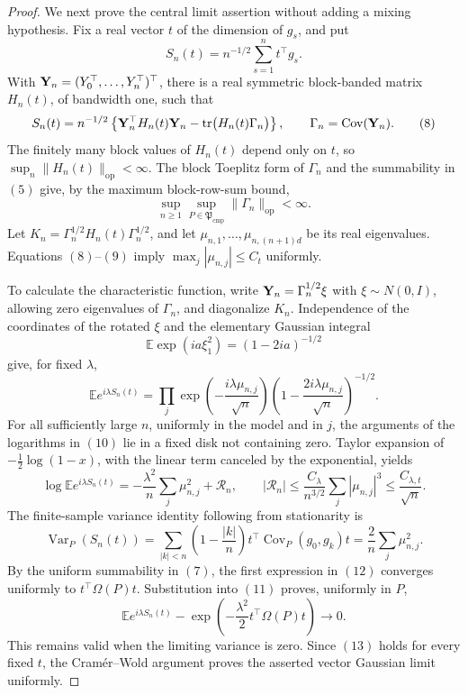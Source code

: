 \documentclass{article}
\begin{document}
\begin{proof}
We next prove the central limit assertion without adding a mixing hypothesis.  Fix a real vector \(t\) of the dimension of \(g_s\), and put
\[
 S_n(t)=n^{-1/2}\sum_{s=1}^{n}t^\top g_s.
\]
With \({\bf Y}_n=(Y_0^\top,\ldots,Y_n^\top)^\top\), there is a real symmetric block-banded matrix \(H_n(t)\), of bandwidth one, such that
\[
 S_n(t)=n^{-1/2}
 \left\{{\bf Y}_n^\top H_n(t){\bf Y}_n
 -\operatorname{tr}\bigl(H_n(t)\Gamma_n\bigr)\right\},
 \qquad \Gamma_n=\operatorname{Cov}({\bf Y}_n).            \tag{8}
\]
The finitely many block values of \(H_n(t)\) depend only on \(t\), so \(\sup_n\lVert H_n(t)\rVert_{\mathrm{op}}<\infty\).  The block Toeplitz form of \(\Gamma_n\) and the summability in \((5)\) give, by the maximum block-row-sum bound,
\[
 \sup_{n\ge1}\sup_{P\in\mathfrak P_{\mathrm{cmp}}}
 \lVert\Gamma_n\rVert_{\mathrm{op}}<\infty.               \tag{9}
\]
Let \(K_n=\Gamma_n^{1/2}H_n(t)\Gamma_n^{1/2}\), and let \(\mu_{n,1},\ldots,\mu_{n,(n+1)d}\) be its real eigenvalues.  Equations \((8)\)--\((9)\) imply \(\max_j|\mu_{n,j}|\le C_t\) uniformly.

To calculate the characteristic function, write \({\bf Y}_n=\Gamma_n^{1/2}\xi\) with \(\xi\sim N(0,I)\), allowing zero eigenvalues of \(\Gamma_n\), and diagonalize \(K_n\).  Independence of the coordinates of the rotated \(\xi\) and the elementary Gaussian integral
\[
 \mathbb E\exp(i a\xi_1^2)=(1-2ia)^{-1/2}
\]
give, for fixed \(\lambda\),
\[
 \mathbb E e^{i\lambda S_n(t)}
 =\prod_j
 \exp\!\left(-\frac{i\lambda\mu_{n,j}}{\sqrt n}\right)
 \left(1-\frac{2i\lambda\mu_{n,j}}{\sqrt n}\right)^{-1/2}. \tag{10}
\]
For all sufficiently large \(n\), uniformly in the model and in \(j\), the arguments of the logarithms in \((10)\) lie in a fixed disk not containing zero.  Taylor expansion of \(-\frac12\log(1-x)\), with the linear term canceled by the exponential, yields
\[
 \log\mathbb E e^{i\lambda S_n(t)}
 =-\frac{\lambda^2}{n}\sum_j\mu_{n,j}^2+\mathcal R_n,
 \qquad
 |\mathcal R_n|
 \le \frac{C_\lambda}{n^{3/2}}\sum_j|\mu_{n,j}|^3
 \le\frac{C_{\lambda,t}}{\sqrt n}.                        \tag{11}
\]
The finite-sample variance identity following from stationarity is
\[
 \operatorname{Var}_P(S_n(t))
 =\sum_{|k|<n}\left(1-\frac{|k|}{n}\right)
 t^\top\operatorname{Cov}_P(g_0,g_k)t
 =\frac{2}{n}\sum_j\mu_{n,j}^2.                            \tag{12}
\]
By the uniform summability in \((7)\), the first expression in \((12)\) converges uniformly to \(t^\top\Omega(P)t\).  Substitution into \((11)\) proves, uniformly in \(P\),
\[
 \mathbb E e^{i\lambda S_n(t)}
 -\exp\!\left(-\frac{\lambda^2}{2}t^\top\Omega(P)t\right)
 \longrightarrow0.                                        \tag{13}
\]
This remains valid when the limiting variance is zero.  Since \((13)\) holds for every fixed \(t\), the Cram\'er--Wold argument proves the asserted vector Gaussian limit uniformly.


\end{proof}
\end{document}
